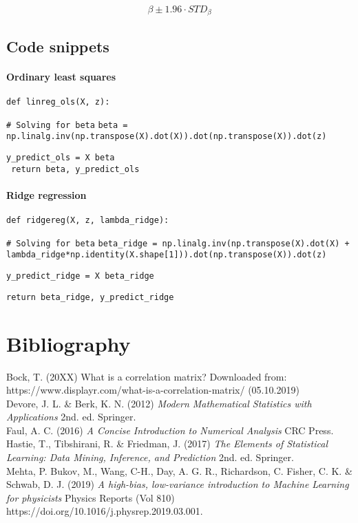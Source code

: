 \documentclass[a4paper]{article}
\begin{document}
\begin{equation}
\beta \pm 1.96 \cdot STD_{\beta}
\end{equation}

\subsection{Code snippets}

\paragraph{Ordinary least squares}

\texttt{def linreg\_ols(X, z):}
    
\indent \texttt{\# Solving for beta}
    \texttt{beta = np.linalg.inv(np.transpose(X).dot(X)).dot(np.transpose(X)).dot(z)}
    
    \texttt{y\_predict\_ols = X \@ beta}
    \\
    \texttt{ return beta, y\_predict\_ols}

\paragraph{Ridge regression}

\texttt{def ridgereg(X, z, lambda\_ridge):}

    \indent \texttt{\# Solving for beta}
    \texttt{beta\_ridge = np.linalg.inv(np.transpose(X).dot(X) + lambda\_ridge*np.identity(X.shape[1])).dot(np.transpose(X)).dot(z)}

    \texttt{y\_predict\_ridge = X \@ beta\_ridge}
    
    \texttt{return beta\_ridge, y\_predict\_ridge}


\section{Bibliography}

Bock, T. (20XX) What is a correlation matrix? Downloaded from: https://www.displayr.com/what-is-a-correlation-matrix/ (05.10.2019) \\

Devore, J. L. \& Berk, K. N. (2012) \textit{Modern Mathematical Statistics with Applications} 2nd. ed. Springer. \\

Faul, A. C. (2016) \textit{A Concise Introduction to Numerical Analysis} CRC Press. \\

Hastie, T., Tibshirani, R. \& Friedman, J. (2017) \textit{The Elements of Statistical Learning: Data Mining, Inference, and Prediction} 2nd. ed. Springer. \\

Mehta, P. Bukov, M., Wang, C-H., Day, A. G. R., Richardson, C. Fisher, C. K. \& Schwab, D. J. (2019) \textit{A high-bias, low-variance introduction to Machine Learning for physicists} Physics Reports (Vol 810) https://doi.org/10.1016/j.physrep.2019.03.001.
\end{document}
